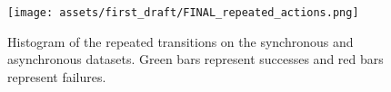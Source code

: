\begin{figure}[t!]
    \centering
    \texttt{[image: assets/first\_draft/FINAL\_repeated\_actions.png]}
    \caption{ Histogram of the repeated transitions on the synchronous and asynchronous datasets. Green bars represent successes and red bars represent failures.}
    \label{fig:histogram_repeated_transitions}
\end{figure}